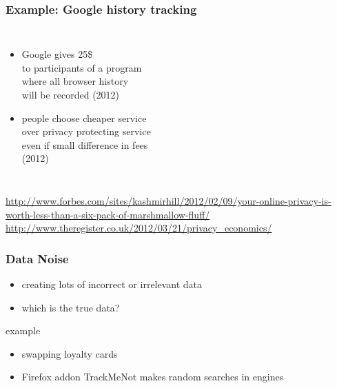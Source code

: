 \documentclass[dvipsnames]{beamer}
\theoremstyle{plain}
\begin{document}
\begin{frame}
  \frametitle{Example: Google history tracking}

  \begin{columns}

    \begin{itemize}
      \item Google gives 25\$\\
      to participants of a program\\
      where all browser history\\
      will be recorded (2012)

      \medskip
      \item people choose cheaper service\\
        over privacy protecting service\\
        even if small difference in fees\\
        (2012)
    \end{itemize}
  \end{columns}

  \medskip
  \tiny{\url{http://www.forbes.com/sites/kashmirhill/2012/02/09/your-online-privacy-is-worth-less-than-a-six-pack-of-marshmallow-fluff/}}\\
  \tiny{\url{http://www.theregister.co.uk/2012/03/21/privacy_economics/}}\\
\end{frame}

\begin{frame}
  \frametitle{Data Noise}

  \begin{itemize}
    \item creating lots of incorrect or irrelevant data
    \item which is the true data?
  \end{itemize}

  \begin{exampleblock}{example}
    \begin{itemize}
      \item swapping loyalty cards
      \item Firefox addon TrackMeNot makes random searches in engines
    \end{itemize}
  \end{exampleblock}
\end{frame}
\end{document}
